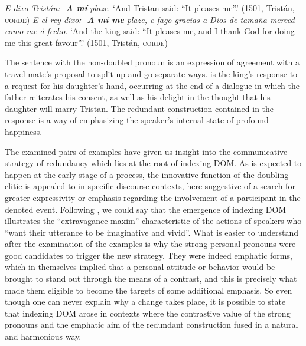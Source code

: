 \documentclass[output=paper]{LSP/langsci}
\begin{document}
\begin{exe}
\ex%
\label{04-me-ex:18}
\begin{xlist}
\ex%
\label{04-me-ex:18a}
\textit{E dixo Tristán: -}\textbf{\textit{A mí}} \textit{plaze}.
\glt ‘And Tristan said: “It pleases me”.’ (1501, Tristán, \textsc{corde)}
\ex%
\label{04-me-ex:18b}
\textit{E el rey dixo: -}\textbf{\textit{A mí me}} \textit{plaze, e fago gracias a Dios de tamaña merced} \textit{como me á fecho}. 
\glt ‘And the king said: “It pleases me, and I thank God for doing me this great favour”.’ (1501, Tristán, \textsc{corde)}
\end{xlist}
\end{exe}

The sentence with the non-doubled pronoun is an expression of agreement with a travel mate’s proposal to split up and go separate ways.  is the king’s response to a request for his daughter’s hand, occurring at the end of a dialogue in which the father reiterates his consent, as well as his delight in the thought that his daughter will marry Tristan. The redundant construction contained in the response is a way of emphasizing the speaker’s internal state of profound happiness.

The examined pairs of examples have given us insight into the communicative strategy of redundancy which lies at the root of  indexing DOM. As is expected to happen at the early stage of a  process, the innovative function of the doubling clitic is appealed to in specific discourse contexts, here suggestive of a search for greater expressivity or emphasis regarding the involvement of a participant in the denoted event. Following \citet[1057]{Haspelmath1999Why}, we could say that the emergence of  indexing DOM illustrates the “extravagance maxim” characteristic of the actions of speakers who “want their utterance to be imaginative and vivid”. 
What is easier to understand after the examination of the examples is why the strong personal pronouns were good candidates to trigger the new strategy. They were indeed emphatic forms, which in themselves implied that a personal attitude or behavior would be brought to stand out through the means of a contrast, and this is precisely what made them eligible to become the targets of some additional emphasis. So even though one can never explain why a change takes place, it is possible to state that  indexing DOM arose in contexts where the contrastive value of the strong pronouns and the emphatic aim of the redundant construction fused in a natural and harmonious way. 
\end{document}
